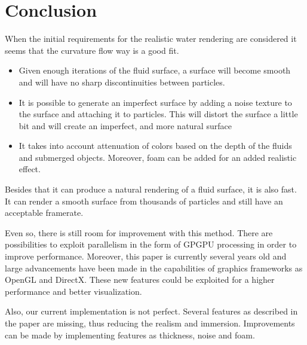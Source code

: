 \section{Conclusion}
When the initial requirements for the realistic water rendering are considered it seems that the curvature flow way is a good fit.
\begin{itemize}
\item Given enough iterations of the fluid surface, a surface will become smooth and will have no sharp discontinuities between particles.
\item It is possible to generate an imperfect surface by adding a noise texture to the surface and attaching it to particles. This will distort the surface a little bit and will create an imperfect, and more natural surface
\item It takes into account attenuation of colors based on the depth of the fluids and submerged objects. Moreover, foam can be added for an added realistic effect.
\end{itemize}
Besides that it can produce a natural rendering of a fluid surface, it is also fast. 
It can render a smooth surface from thousands of particles and still have an acceptable framerate. 

Even so, there is still room for improvement with this method. There are possibilities to exploit parallelism in the form of GPGPU processing in order to improve performance.
Moreover, this paper is currently several years old and large advancements have been made in the capabilities of graphics frameworks as OpenGL and DirectX.
These new features could be exploited for a higher performance and better visualization.

Also, our current implementation is not perfect. Several features as described in the paper are missing, thus reducing the realism and immersion. Improvements can be made by implementing features as thickness, noise and foam.